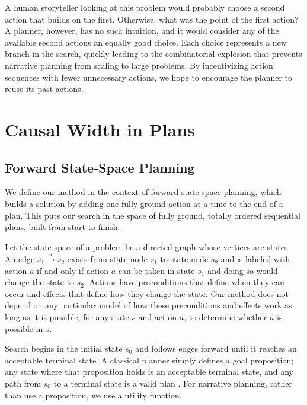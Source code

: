 \documentclass[letterpaper]{article} %
\begin{document}
A human storyteller looking at this problem would
probably choose a second action that builds on the first.
Otherwise, what was the point of the first action? A planner,
however, has no such intuition, and it would consider any of
the available second actions an equally good choice. Each
choice represents a new branch in the search, quickly leading
to the combinatorial explosion that prevents narrative
planning from scaling to large problems. By incentivizing
action sequences with fewer unnecessary actions, we
hope to encourage the planner to reuse its past actions.

\section{Causal Width in Plans}

\subsection{Forward State-Space Planning}
We define our method in the context of forward state-space
planning, which builds a solution by adding one fully ground action at a time to the end of a plan. This puts our search in the space of fully ground, totally ordered sequential plans, built from start to finish.

Let the state space of a problem be a directed
graph whose vertices are states. An edge $s_1 \xrightarrow{a} s_2$ exists from
state node $s_1$ to state node $s_2$ and is labeled with action $a$
if and only if action $a$ can be taken in state $s_1$ and doing so
would change the state to $s_2$. Actions have preconditions that define when they can occur and effects that define how they change the state. Our method does not depend on any particular model of how these preconditions and effects work as long as it is possible, for any state $s$ and action $a$, to determine whether $a$ is possible in $s$.

Search begins in the initial state $s_0$ and follows edges
forward until it reaches an acceptable terminal state. A
classical planner simply defines a goal proposition; any state
where that proposition holds is an acceptable terminal state,
and any path from $s_0$ to a terminal state is a valid plan
\cite{russellnorvig}.
For narrative planning, rather than use a proposition, we use a utility function.
\end{document}
